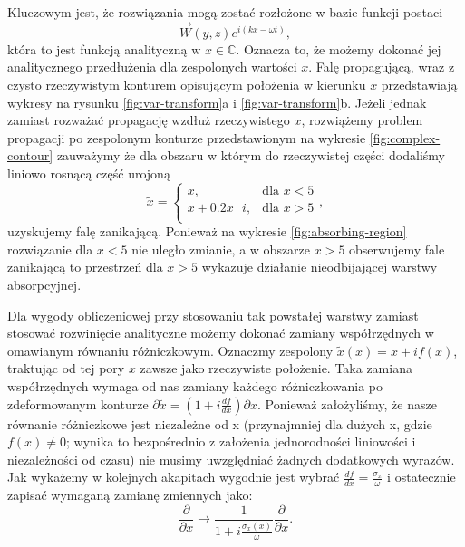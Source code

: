 Kluczowym jest, że rozwiązania mogą zostać rozłożone w bazie funkcji postaci
\begin{equation}
\vec{W}(y,z)e^{i(kx-\omega t)},
\end{equation}
która to jest funkcją analityczną w $x\in \mathbb{C}$. Oznacza to, że możemy dokonać jej analitycznego przedłużenia dla zespolonych wartości $x$. Falę propagującą, wraz z czysto rzeczywistym konturem opisującym położenia w kierunku $x$ przedstawiają wykresy na rysunku \ref{fig:var-transform}a i \ref{fig:var-transform}b. Jeżeli jednak zamiast rozważać propagację wzdłuż rzeczywistego $x$, rozwiążemy problem propagacji po zespolonym konturze przedstawionym na wykresie \ref{fig:complex-contour} zauważymy że dla obszaru w którym do rzeczywistej części dodaliśmy liniowo rosnącą część urojoną
\begin{equation}
\tilde{x}=  
\begin{cases} 
        x, & \mbox{dla } x< 5 \\ 
        x+0.2x\mbox{ }i, & \mbox{dla } x>5 \\
\end{cases},
\end{equation}
 uzyskujemy falę zanikającą. Ponieważ na wykresie \ref{fig:absorbing-region} rozwiązanie dla $x<5$ nie uległo zmianie, a w obszarze $x>5$ obserwujemy fale zanikającą to przestrzeń dla $x>5$ wykazuje działanie nieodbijającej warstwy absorpcyjnej.

Dla wygody obliczeniowej przy stosowaniu tak powstałej warstwy zamiast stosować rozwinięcie analityczne możemy dokonać zamiany współrzędnych w omawianym równaniu różniczkowym. Oznaczmy zespolony $\tilde{x}(x)=x+if(x)$, traktując od tej pory $x$ zawsze jako rzeczywiste położenie. Taka zamiana współrzędnych wymaga od nas zamiany każdego różniczkowania po zdeformowanym konturze $\partial \tilde{x} = (1+i\frac{df}{dx}) \partial x$. Ponieważ założyliśmy, że nasze równanie różniczkowe jest niezależne od x (przynajmniej dla dużych x, gdzie $f(x)\ne0$; wynika to bezpośrednio z założenia jednorodności liniowości i niezależności od czasu) nie musimy uwzględniać żadnych dodatkowych wyrazów. Jak wykażemy w kolejnych akapitach wygodnie jest wybrać $\frac{df}{dx}=\frac{\sigma_x}{\omega}$ i ostatecznie zapisać wymaganą zamianę zmiennych jako:
\begin{equation}
	\frac{\partial}{\partial \tilde{x}} \to \frac{1} {1+i \frac{\sigma_x(x)}{\omega}} \frac{\partial}{\partial x}.
	\label{eq:pml-variable-change}
\end{equation}

